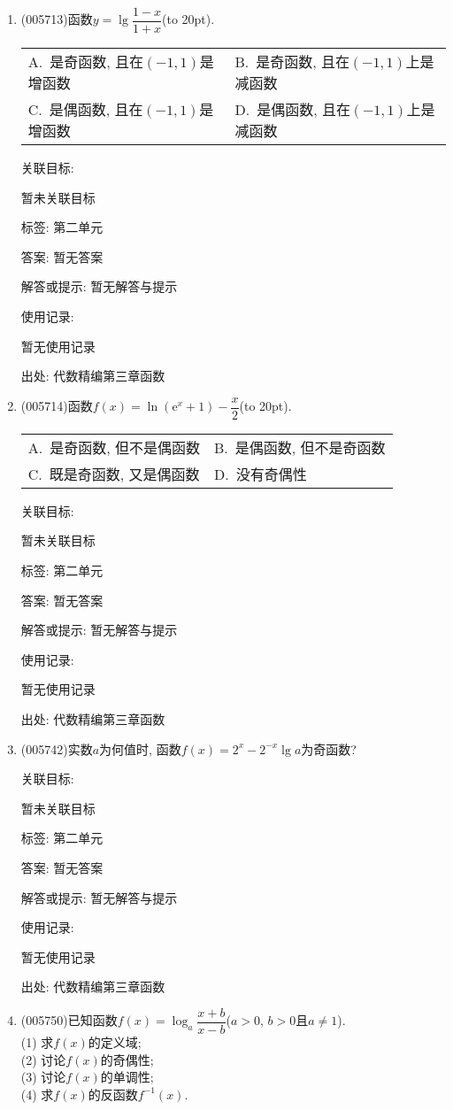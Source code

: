 \documentclass[10pt,a4paper]{article}
\newcommand{\bracket}[1]{(\hbox to #1pt{})}
\newcommand{\twoch}[4]{\par\begin{tabular}{p{.46\textwidth}p{.46\textwidth}}
A.~#1& B.~#2\\
C.~#3& D.~#4
\end{tabular}}
\begin{document}
\begin{enumerate}[1.]
关联目标:

暂未关联目标



标签: 第二单元

答案: 暂无答案

解答或提示: 暂无解答与提示

使用记录:

暂无使用记录


出处: 代数精编第三章函数
\item { (005713)}函数$y=\lg \dfrac{1-x}{1+x}$\bracket{20}.
\twoch{是奇函数, 且在$(-1, 1)$是增函数}{是奇函数, 且在$(-1, 1)$上是减函数}{是偶函数, 且在$(-1, 1)$是增函数}{是偶函数, 且在$(-1, 1)$上是减函数}


关联目标:

暂未关联目标



标签: 第二单元

答案: 暂无答案

解答或提示: 暂无解答与提示

使用记录:

暂无使用记录


出处: 代数精编第三章函数
\item { (005714)}函数$f(x)=\ln (\mathrm{e}^x+1)-\dfrac x2$\bracket{20}.
\twoch{是奇函数, 但不是偶函数}{是偶函数, 但不是奇函数}{既是奇函数, 又是偶函数}{没有奇偶性}


关联目标:

暂未关联目标



标签: 第二单元

答案: 暂无答案

解答或提示: 暂无解答与提示

使用记录:

暂无使用记录


出处: 代数精编第三章函数
\item { (005742)}实数$a$为何值时, 函数$f(x)=2^x-2^{-x}\lg a$为奇函数?


关联目标:

暂未关联目标



标签: 第二单元

答案: 暂无答案

解答或提示: 暂无解答与提示

使用记录:

暂无使用记录


出处: 代数精编第三章函数
\item { (005750)}已知函数$f(x)=\log_a\dfrac{x+b}{x-b}$($a>0$, $b>0$且$a\ne 1$).\\
(1) 求$f(x)$的定义域;\\
(2) 讨论$f(x)$的奇偶性;\\
(3) 讨论$f(x)$的单调性;\\
(4) 求$f(x)$的反函数$f^{-1}(x)$.



\end{enumerate}
\end{document}
